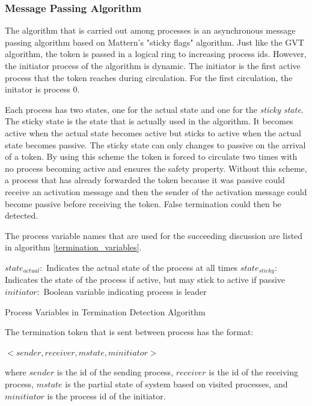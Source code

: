\documentclass[11pt]{book}
\begin{document}
\subsubsection{Message Passing Algorithm}

The algorithm that is carried out among processes is an asynchronous message passing
algorithm based on Mattern's "sticky flags" algorithm\cite{mattern-93}. Just like the GVT
algorithm, the token is passed in a logical ring to increasing process ids. However, the
initiator process of the algorithm is dynamic. The initiator is the first active process
that the token reaches during circulation. For the first circulation, the initator is process
0.

Each process has two states, one for the actual state and one for the \emph{sticky state}.
The sticky state is the state that is actually used in the algorithm. It becomes active
when the actual state becomes active but sticks to active when the actual state becomes
passive. The sticky state can only changes to passive on the arrival of a token. By using
this scheme the token is forced to circulate two times with no process becoming active and
ensures the safety property. Without this scheme, a process that has already forwarded the
token because it was passive could receive an activation message and then the sender of the
activation message could become passive before receiving the token. False termination could
then be detected.

The process variable names that are used for the succeeding discussion are listed in
algorithm \ref{termination_variables}.

\begin{algorithm}
\DontPrintSemicolon
    \boldmath$state_{actual}:$ Indicates the actual state of the process at all times\;
    \boldmath$state_{sticky}:$ Indicates the state of the process if active, but may stick
        to active if passive\;
    \boldmath$initiator:$ Boolean variable indicating process is leader\;
\caption{Process Variables in Termination Detection Algorithm}\label{termination_variables}
\end{algorithm}

\noindent
The termination token that is sent between process has the format:

    $<sender, receiver, mstate, minitiator>$

\noindent
where $sender$ is the id of the sending process, $receiver$ is the id of the receiving
process, $mstate$ is the partial state of system based on visited processes, and $minitiator$
is the process id of the initiator.
\end{document}
